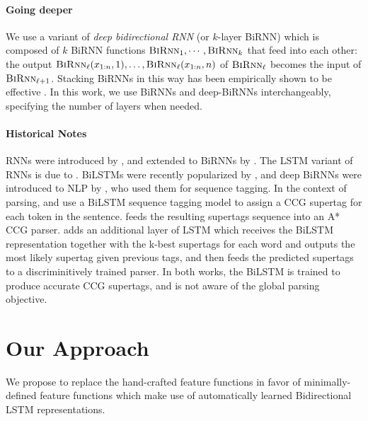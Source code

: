 \documentclass[11pt]{article}
\begin{document}
\paragraph{Going deeper}
We use a variant of \emph{deep bidirectional RNN} (or $k$-layer BiRNN) which is composed of $k$ BiRNN functions
$\textsc{BiRnn}_{1},\cdots,\textsc{BiRnn}_{k}$ that feed into each other: the output
$\textsc{BiRnn}_\ell(x_{1:n},1),\dots,\textsc{BiRnn}_\ell(x_{1:n}, n)$ of $\textsc{BiRnn}_{\ell}$ becomes the input of $\textsc{BiRnn}_{\ell+1}$.  Stacking BiRNNs in this way has been empirically shown to be effective \cite{irsoy2014opinion}.  
In this work, we use
BiRNNs and deep-BiRNNs interchangeably, specifying the number of layers when needed.


\paragraph{Historical Notes}
RNNs were introduced by , and extended to BiRNNs by
.  The LSTM variant of RNNs is due to
.  \mbox{BiLSTMs} were recently popularized by , and deep
BiRNNs were introduced to NLP by , who
used them for sequence tagging. 
In the context of parsing,  and  use a \mbox{BiLSTM} sequence tagging model to assign a CCG supertag for each token in the sentence.   feeds the resulting supertags sequence into an A* CCG parser. 
 adds an additional layer of LSTM which receives the \mbox{BiLSTM} representation together with the k-best supertags for each word and outputs the most likely supertag given previous tags, and then feeds the predicted supertags to a discriminitively trained parser. In both works, the \mbox{BiLSTM} is trained to produce accurate CCG supertags, and is not aware of the global parsing objective.
\section{Our Approach}
\label{sec:method}

We propose to replace the hand-crafted feature functions in favor of
minimally-defined feature functions which make use of automatically learned Bidirectional LSTM
representations.
\end{document}
